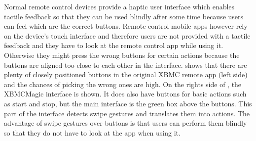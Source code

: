 Normal remote control devices provide a haptic user interface which enables tactile feedback so that they can be used blindly after some time because users can feel which are the correct buttons. Remote control mobile apps however rely on the device's touch interface and therefore users are not provided with a tactile feedback and they have to look at the remote control app while using it. Otherwise they might press the wrong buttons for certain actions because the buttons are aligned too close to each other in the interface.  shows that there are plenty of closely positioned buttons in the original XBMC remote app (left side) and the chances of picking the wrong ones are high. On the rights side of , the XBMCMagic interface is shown. It does also have buttons for basic actions such as start and stop, but the main interface is the green box above the buttons. This part of the interface detects swipe gestures and translates them into actions. The advantage of swipe gestures over buttons is that users can perform them blindly so that they do not have to look at the app when using it.